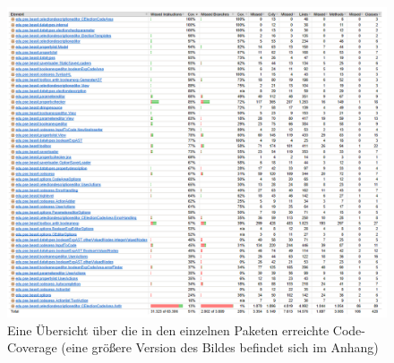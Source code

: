 \documentclass[a4paper]{scrreprt}
\begin{document}
\newpage

\begin{figure}[ht]
	\centering
  \includegraphics[width=1.0\textheight, 
  height=1.0\textwidth, angle=90]{images/Coverage.png} \caption{Eine Übersicht über die
  in den einzelnen Paketen erreichte Code-Coverage (eine größere Version des
  Bildes befindet sich im Anhang)}
	\label{coverage_alt}
\end{figure}

\newpage
\end{document}
